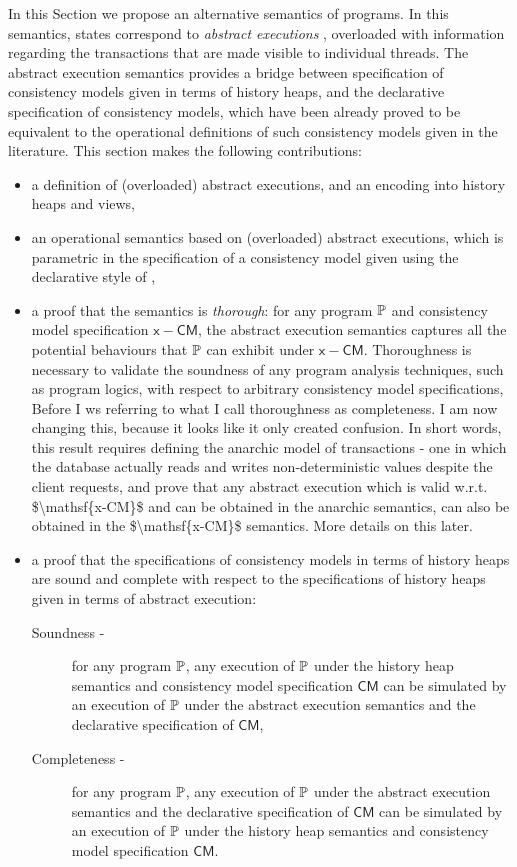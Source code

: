 In this Section we propose an alternative 
semantics of programs. In this semantics, states 
correspond to \emph{abstract executions} \cite{framework-concur}, 
overloaded with information regarding the transactions that are made 
visible to individual threads. 
The abstract execution semantics provides a bridge between specification 
of consistency models given in terms of history heaps, and the declarative 
specification of consistency models, which have been already proved 
to be equivalent to the operational definitions of such consistency models 
given in the literature. This section makes the following contributions: 
\begin{itemize}
\item a definition of (overloaded) abstract executions, and an encoding 
into history heaps and views,
\item an operational semantics based on (overloaded) abstract executions, 
which is parametric in the specification of a consistency model given using 
the declarative style of \cite{framework-concur,SIanalysis,laws},
\item a proof that the semantics is \emph{thorough}: for any program $\mathbb{P}$ and consistency model specification $\mathsf{x-CM}$, 
the abstract execution semantics captures all the potential behaviours that $\mathbb{P}$ can 
exhibit under $\mathsf{x-CM}$. Thoroughness is necessary to validate the soundness of 
any program analysis techniques, such as program logics, with respect to arbitrary consistency model 
specifications,
\ac{Before I ws referring to what I call thoroughness as completeness. I am now changing this, because 
it looks like it only created confusion. In short words, this result requires defining the anarchic model 
of transactions - one in which the database actually reads and writes non-deterministic values 
despite the client requests, and prove that any abstract execution which is 
valid w.r.t. $\mathsf{x-CM}$ and can be obtained in the anarchic semantics, can also be obtained 
in the $\mathsf{x-CM}$ semantics. More details on this later.} 
\item a proof that the specifications of consistency models in terms of history heaps 
are sound and complete with respect to the specifications of history heaps given 
in terms of abstract execution: 
\begin{description}
\item[Soundness - ] for any program $\mathbb{P}$, any execution of 
$\mathbb{P}$ under the history heap semantics and consistency model 
specification $\mathsf{CM}$ can be simulated by an execution 
of $\mathbb{P}$ under the abstract execution semantics and the 
declarative specification of $\mathsf{CM}$, 
\item[Completeness - ] for any program $\mathbb{P}$, any 
execution of $\mathbb{P}$ under the abstract execution semantics 
and the declarative specification of $\mathsf{CM}$ 
can be simulated by an execution of $\mathbb{P}$ under the history 
heap semantics and consistency model specification $\mathsf{CM}$.
\end{description}
\end{itemize}

